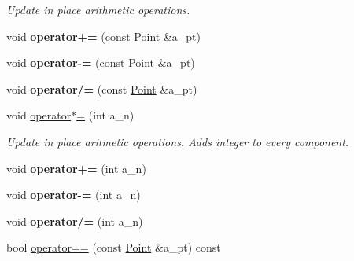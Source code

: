 \begin{DoxyCompactItemize}
\begin{DoxyCompactList}\small\item\em Update in place arithmetic operations. \end{DoxyCompactList}\item 
\hypertarget{classPoint_a587465b64c61c24c7bcb9abf0dfda114}{}void {\bfseries operator+=} (const \hyperlink{classPoint}{Point} \&a\+\_\+pt)\label{classPoint_a587465b64c61c24c7bcb9abf0dfda114}

\item 
\hypertarget{classPoint_a5c41a95bd50b076bdca75d920f73554f}{}void {\bfseries operator-\/=} (const \hyperlink{classPoint}{Point} \&a\+\_\+pt)\label{classPoint_a5c41a95bd50b076bdca75d920f73554f}

\item 
\hypertarget{classPoint_a61672dab6c26441eac5aca9928cdfc1f}{}void {\bfseries operator/=} (const \hyperlink{classPoint}{Point} \&a\+\_\+pt)\label{classPoint_a61672dab6c26441eac5aca9928cdfc1f}

\item 
\hypertarget{classPoint_a79d9895cf934366e864a69a483e5b8ad}{}void \hyperlink{classPoint_a79d9895cf934366e864a69a483e5b8ad}{operator$\ast$=} (int a\+\_\+n)\label{classPoint_a79d9895cf934366e864a69a483e5b8ad}

\begin{DoxyCompactList}\small\item\em Update in place aritmetic operations. Adds integer to every component. \end{DoxyCompactList}\item 
\hypertarget{classPoint_ae6e49461a0bc525c0f55bd5ce42db45b}{}void {\bfseries operator+=} (int a\+\_\+n)\label{classPoint_ae6e49461a0bc525c0f55bd5ce42db45b}

\item 
\hypertarget{classPoint_a880f2ce648e6011177058678f6b2021b}{}void {\bfseries operator-\/=} (int a\+\_\+n)\label{classPoint_a880f2ce648e6011177058678f6b2021b}

\item 
\hypertarget{classPoint_a62ab14874fced136ff69ed4cf6d34c90}{}void {\bfseries operator/=} (int a\+\_\+n)\label{classPoint_a62ab14874fced136ff69ed4cf6d34c90}

\item 
\hypertarget{classPoint_a40ee8f921d2641d6380188419e4885b3}{}bool \hyperlink{classPoint_a40ee8f921d2641d6380188419e4885b3}{operator==} (const \hyperlink{classPoint}{Point} \&a\+\_\+pt) const \label{classPoint_a40ee8f921d2641d6380188419e4885b3}


\end{DoxyCompactItemize}
